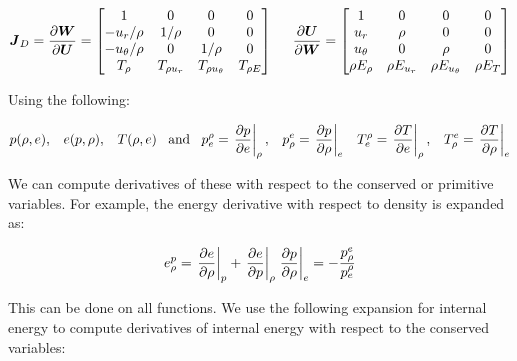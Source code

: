 \documentclass[10pt]{article}
\begin{document}
\begin{flushleft}
\begin{equation*}
    \boldsymbol{J}_D = \frac{\partial \boldsymbol{W}}{\partial \boldsymbol{U}} = \begin{bmatrix} 
        1 & 0 & 0 & 0 \\
        -u_r / \rho & 1 / \rho & 0 & 0 \\
        -u_\theta / \rho & 0 & 1 / \rho & 0 \\
        T_\rho & T_{\rho u_r} & T_{\rho u_\theta} & T_{\rho E}
    \end{bmatrix} \hspace{5mm} \frac{\partial \boldsymbol{U}}{\partial \boldsymbol{W}} = \begin{bmatrix}
        1 & 0 & 0 & 0 \\
        u_r  & \rho & 0 & 0 \\
        u_\theta & 0 & \rho & 0 \\
        \rho E_\rho & \rho E_{u_r} & \rho E_{u_\theta} & \rho E_T
    \end{bmatrix}
\end{equation*}


Using the following:

\begin{equation*}
    p(\rho, e), \hspace{3mm} e(p, \rho), \hspace{3mm} T(\rho, e) \hspace{3mm} \text{and} \hspace{3mm} p_e^\rho = \left. \frac{\partial p}{\partial e} \right|_\rho, \hspace{3mm}  p_\rho^e = \left. \frac{\partial p}{\partial \rho} \right|_e \hspace{3mm} T_e^\rho = \left. \frac{\partial T}{\partial e} \right|_\rho, \hspace{3mm}  T_\rho^e = \left. \frac{\partial T}{\partial \rho} \right|_e
\end{equation*}

We can compute derivatives of these with respect to the conserved or primitive variables. For example, the energy derivative with respect to density is expanded as:

\begin{equation*}
    e_\rho^p = \left. \frac{\partial e}{\partial \rho} \right|_p + \left. \frac{\partial e}{\partial p} \right|_\rho \left. \frac{\partial p}{\partial \rho} \right|_e = -\frac{p_\rho^e}{p_e^\rho}
\end{equation*}

This can be done on all functions. We use the following expansion for internal energy to compute derivatives of internal energy with respect to the conserved variables:


\end{flushleft}
\end{document}
